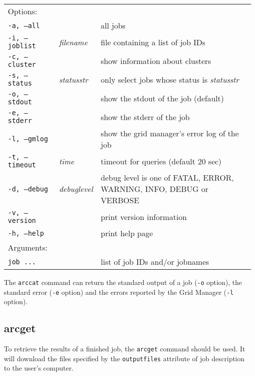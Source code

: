\hspace*{0.5cm}
\begin{shaded}
\end{shaded}
\begin{longtable}{llp{8cm}}
   Options:&&\\
   \texttt{-a, --all}& & all jobs\\
   \texttt{-i, --joblist}& \textit{filename} & file containing a list of job IDs\\
   \texttt{-c, --cluster}& & show information about clusters\\
   \texttt{-s, --status}& \textit{statusstr} &only select jobs whose status is \textit{statusstr}\\
   \texttt{-o, --stdout}& & show the stdout of the job (default)\\
   \texttt{-e, --stderr}& & show the stderr of the job\\
   \texttt{-l, --gmlog}& & show the grid manager's error log of the job\\
   \texttt{-t, --timeout}& \textit{time} & timeout for queries (default 20 sec)\\
   \texttt{-d, --debug}& \textit{debuglevel}&debug level is one of  FATAL, ERROR, WARNING, INFO, DEBUG or VERBOSE\\
   \texttt{-v, --version}& & print version information\\
   \texttt{-h, --help}& & print help page\\
   Arguments:&&\\
   \texttt{job ...} && list of job IDs and/or jobnames\\
\end{longtable}

The \texttt{arccat} command can return the standard output of a job
(\texttt{-o} option), the standard error (\texttt{-e} option) and the
errors reported by the Grid Manager (\texttt{-l} option).

\begin{framed}

\end{framed}


\subsection{arcget}
\label{sec:arcget}

To retrieve the results of a finished job, the \texttt{arcget}
 command should be used. It
will download the files specified by the \texttt{outputfiles}
attribute of job description to the user's computer.

